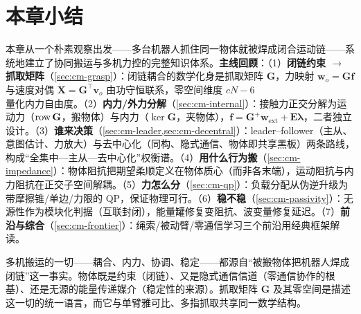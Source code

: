 \section*{本章小结}

本章从一个朴素观察出发——多台机器人抓住同一物体就被焊成闭合运动链——系统地建立了协同搬运与多机力控的完整知识体系。\textbf{主线回顾}：（1）\textbf{闭链约束 $\to$ 抓取矩阵}（\cref{sec:cm-grasp}）：闭链耦合的数学化身是抓取矩阵 $\mathbf{G}$，力映射 $\mathbf{w}_o=\mathbf{G}\mathbf{f}$ 与速度对偶 $\dot{\mathbf{X}}=\mathbf{G}^\top\mathbf{v}_o$ 由功守恒联系，零空间维度 $cN-6$ 量化内力自由度。（2）\textbf{内力/外力分解}（\cref{sec:cm-internal}）：接触力正交分解为运动力（$\operatorname{row}\mathbf{G}$，搬物体）与内力（$\ker\mathbf{G}$，夹物体），$\mathbf{f}=\mathbf{G}^{+}\mathbf{w}_{\text{ext}}+\mathbf{E}\boldsymbol{\lambda}$，二者独立设计。（3）\textbf{谁来决策}（\cref{sec:cm-leader,sec:cm-decentral}）：leader--follower（主从、意图估计、力放大）与去中心化（同构、隐式通信、物体即共享黑板）两条路线，构成“全集中—主从—去中心化”权衡谱。（4）\textbf{用什么行为搬}（\cref{sec:cm-impedance}）：物体阻抗把期望柔顺定义在物体质心（而非各末端），运动阻抗与内力阻抗在正交子空间解耦。（5）\textbf{力怎么分}（\cref{sec:cm-qp}）：负载分配从伪逆升级为带摩擦锥/单边/力限的 QP，保证物理可行。（6）\textbf{稳不稳}（\cref{sec:cm-passivity}）：无源性作为模块化判据（互联封闭），能量罐修复变阻抗、波变量修复延迟。（7）\textbf{前沿与综合}（\cref{sec:cm-frontier}）：绳索/被动臂/零通信学习三个前沿用经典框架解读。

\begin{insight}[贯穿全章的本质洞察]
多机搬运的一切——耦合、内力、协调、稳定——都源自“被搬物体把机器人焊成闭链”这一事实。物体既是约束（闭链）、又是隐式通信信道（零通信协作的根基）、还是无源的能量传递媒介（稳定性的来源）。抓取矩阵 $\mathbf{G}$ 及其零空间是描述这一切的统一语言，而它与单臂雅可比、多指抓取共享同一数学结构。
\end{insight}

